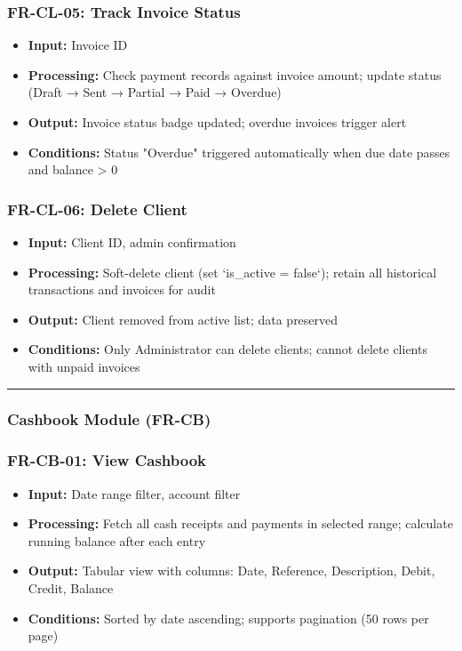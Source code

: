 \documentclass[journal, a4paper, onecolumn, 12pt]{IEEEtran}
\begin{document}
\subsubsection{FR-CL-05: Track Invoice Status}
\begin{itemize}[leftmargin=*]
\item \textbf{Input:} Invoice ID
\item \textbf{Processing:} Check payment records against invoice amount; update status (Draft → Sent → Partial → Paid → Overdue)
\item \textbf{Output:} Invoice status badge updated; overdue invoices trigger alert
\item \textbf{Conditions:} Status "Overdue" triggered automatically when due date passes and balance > 0
\end{itemize}

\subsubsection{FR-CL-06: Delete Client}
\begin{itemize}[leftmargin=*]
\item \textbf{Input:} Client ID, admin confirmation
\item \textbf{Processing:} Soft-delete client (set `is\_active = false`); retain all historical transactions and invoices for audit
\item \textbf{Output:} Client removed from active list; data preserved
\item \textbf{Conditions:} Only Administrator can delete clients; cannot delete clients with unpaid invoices
\end{itemize}

\vspace{1em}\hrule\vspace{1em}

\subsubsection{Cashbook Module (FR-CB)}

\subsubsection{FR-CB-01: View Cashbook}
\begin{itemize}[leftmargin=*]
\item \textbf{Input:} Date range filter, account filter
\item \textbf{Processing:} Fetch all cash receipts and payments in selected range; calculate running balance after each entry
\item \textbf{Output:} Tabular view with columns: Date, Reference, Description, Debit, Credit, Balance
\item \textbf{Conditions:} Sorted by date ascending; supports pagination (50 rows per page)
\end{itemize}
\end{document}
